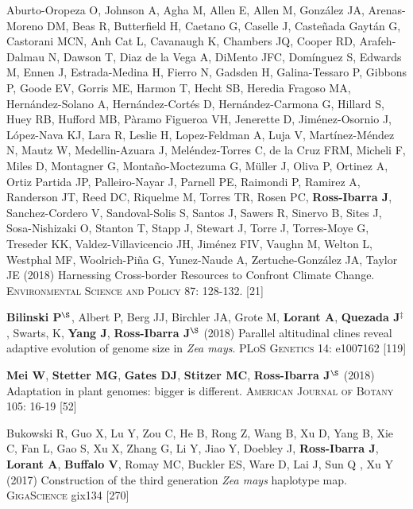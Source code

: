 \documentclass[letterpaper,10pt]{article}
\begin{document}
\begin{etaremune}
\item  Aburto-Oropeza O, Johnson A, Agha M, Allen E,  Allen M,  Gonz\'{a}lez JA, Arenas-Moreno DM, Beas R, Butterfield H, Caetano G, Caselle J, Caste\~{n}ada Gayt\'{a}n G, Castorani MCN, Anh Cat L, Cavanaugh K, Chambers JQ, Cooper RD, Arafeh-Dalmau N, Dawson T, Diaz de la Vega A, DiMento JFC, Dom\'{i}nguez S, Edwards M, Ennen J, Estrada-Medina H, Fierro N, Gadsden H, Galina-Tessaro P, Gibbons P, Goode EV, Gorris ME, Harmon T, Hecht SB, Heredia Fragoso MA, Hern\'{a}ndez-Solano A, Hern\'{a}ndez-Cort\'{e}s D, Hern\'{a}ndez-Carmona G, Hillard S, Huey RB, Hufford MB, P\`{a}ramo Figueroa VH, Jenerette D, Jim\'{e}nez-Osornio J, L\'{o}pez-Nava KJ, Lara R, Leslie H, Lopez-Feldman A, Luja V, Mart\'{i}nez-M\'{e}ndez N, Mautz W, Medellin-Azuara J, Mel\'{e}ndez-Torres C, de la Cruz FRM,  Micheli F, Miles D, Montagner G, Monta\~{n}o-Moctezuma G, M\"{u}ller J, Oliva P, Ortinez A, Ortiz Partida JP, Palleiro-Nayar J, Parnell PE, Raimondi P, Ramirez A, Randerson JT, Reed DC, Riquelme M, Torres TR, Rosen PC, {\bf Ross-Ibarra J}, Sanchez-Cordero V, Sandoval-Solis S, Santos J, Sawers R, Sinervo B, Sites J,  Sosa-Nishizaki O, Stanton T, Stapp J, Stewart J, Torre J,  Torres-Moye G, Treseder KK, Valdez-Villavicencio JH, Jim\'{e}nez FIV, Vaughn M, Welton L, Westphal MF, Woolrich-Pi\~{n}a G,  Yunez-Naude A, Zertuche-Gonz\'{a}lez JA, Taylor JE (2018)
Harnessing Cross-border Resources to Confront Climate Change.  \textsc{Environmental Science and Policy}  87: 128-132.
 [21]\\

\item \textbf{Bilinski P}$^\S$, Albert P, Berg JJ, Birchler JA, Grote M, \textbf{Lorant A}, \textbf{Quezada J}$^\ddagger$, Swarts, K, \textbf{Yang J}, \textbf{Ross-Ibarra J}$^\S$ (2018) Parallel altitudinal clines reveal adaptive evolution of genome size in \textit{Zea mays}. \textsc{PLoS Genetics} 14: e1007162
 [119]\\

\item {\bf Mei W}, {\bf Stetter MG}, {\bf Gates DJ}, {\bf Stitzer MC}, {\bf Ross-Ibarra J}$^\S$ (2018) Adaptation in plant genomes: bigger is different.  \textsc{American Journal of Botany} 105: 16-19
 [52]\\

\item Bukowski R, Guo X, Lu Y, Zou C, He B, Rong Z, Wang B,  Xu D,  Yang B, Xie C,  Fan L, Gao S, Xu X, Zhang G, Li Y, Jiao Y, Doebley J, {\bf Ross-Ibarra J}, {\bf Lorant A}, {\bf Buffalo V}, Romay MC, Buckler ES, Ware D, Lai J, Sun Q , Xu Y (2017) Construction of the third generation \emph{Zea mays} haplotype map. \textsc{GigaScience} gix134
 [270]\\


\end{etaremune}
\end{document}
